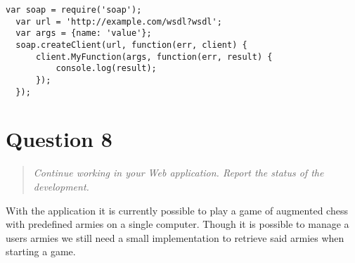 \documentclass[10pt,a4paper]{report}
\begin{document}
\begin{lstlisting}[caption="SOAP service in Node with the Soap library", label={lst:ang2-post}]
  var soap = require('soap');
  var url = 'http://example.com/wsdl?wsdl';
  var args = {name: 'value'};
  soap.createClient(url, function(err, client) {
      client.MyFunction(args, function(err, result) {
          console.log(result);
      });
  });
\end{lstlisting}

\section{Question 8}
\begin{quote}
\textit{Continue working in your Web application. Report the status of the development.}
\end{quote}

With the application it is currently possible to play a game of augmented chess with predefined armies on a single computer. Though it is possible to manage a users armies we still need a small implementation to retrieve said armies when starting a game.
\end{document}
